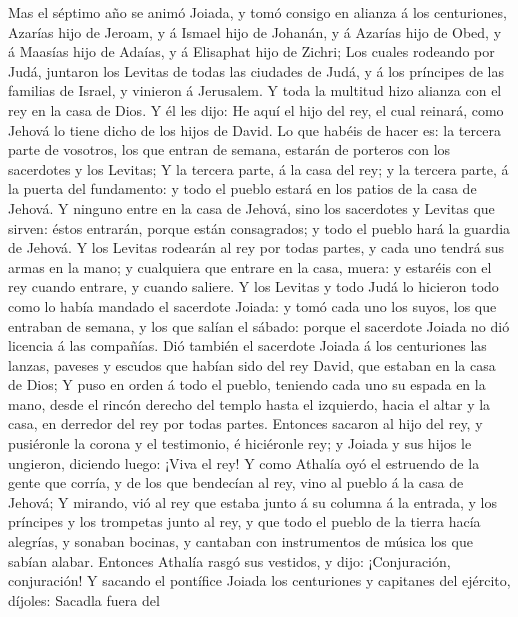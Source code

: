  Mas el séptimo año se animó Joiada, y tomó consigo en
alianza á los centuriones, Azarías hijo de Jeroam, y á Ismael hijo de
Johanán, y á Azarías hijo de Obed, y á Maasías hijo de Adaías, y á
Elisaphat hijo de Zichri;  Los cuales rodeando por Judá,
juntaron los Levitas de todas las ciudades de Judá, y á los príncipes de
las familias de Israel, y vinieron á Jerusalem.  Y toda la
multitud hizo alianza con el rey en la casa de Dios. Y él les dijo: He
aquí el hijo del rey, el cual reinará, como Jehová lo tiene dicho de los
hijos de David.  Lo que habéis de hacer es: la tercera
parte de vosotros, los que entran de semana, estarán de porteros con los
sacerdotes y los Levitas;  Y la tercera parte, á la casa
del rey; y la tercera parte, á la puerta del fundamento: y todo el
pueblo estará en los patios de la casa de Jehová.  Y
ninguno entre en la casa de Jehová, sino los sacerdotes y Levitas que
sirven: éstos entrarán, porque están consagrados; y todo el pueblo hará
la guardia de Jehová.  Y los Levitas rodearán al rey por
todas partes, y cada uno tendrá sus armas en la mano; y cualquiera que
entrare en la casa, muera: y estaréis con el rey cuando entrare, y
cuando saliere.  Y los Levitas y todo Judá lo hicieron
todo como lo había mandado el sacerdote Joiada: y tomó cada uno los
suyos, los que entraban de semana, y los que salían el sábado: porque el
sacerdote Joiada no dió licencia á las compañías.  Dió
también el sacerdote Joiada á los centuriones las lanzas, paveses y
escudos que habían sido del rey David, que estaban en la casa de Dios;
 Y puso en orden á todo el pueblo, teniendo cada uno su
espada en la mano, desde el rincón derecho del templo hasta el
izquierdo, hacia el altar y la casa, en derredor del rey por todas
partes.  Entonces sacaron al hijo del rey, y pusiéronle
la corona y el testimonio, é hiciéronle rey; y Joiada y sus hijos le
ungieron, diciendo luego: ¡Viva el rey!  Y como Athalía
oyó el estruendo de la gente que corría, y de los que bendecían al rey,
vino al pueblo á la casa de Jehová;  Y mirando, vió al
rey que estaba junto á su columna á la entrada, y los príncipes y los
trompetas junto al rey, y que todo el pueblo de la tierra hacía
alegrías, y sonaban bocinas, y cantaban con instrumentos de música los
que sabían alabar. Entonces Athalía rasgó sus vestidos, y dijo:
¡Conjuración, conjuración!  Y sacando el pontífice Joiada
los centuriones y capitanes del ejército, díjoles: Sacadla fuera del
